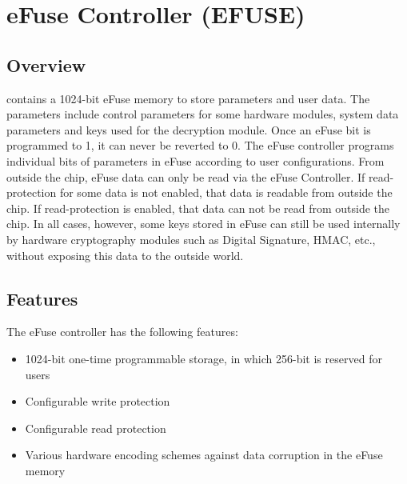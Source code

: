 \documentclass[main\_\_EN.tex]{subfiles}
\begin{document}

\ifglobal
\else
    {\let\clearpage\relax \listoftodos}
    {\let\clearpage\relax \listofdonetodos}
    \tableofcontents
\fi



\hypertarget{efuse}{}
\chapter{eFuse Controller (EFUSE)}
\label{mod:efuse}

\section{Overview}

\chipname{} contains a 1024-bit eFuse memory to store parameters and user data. The parameters include control parameters for some hardware modules, system data parameters and keys used for the decryption module. Once an eFuse bit is programmed to 1, it can never be reverted to 0. The eFuse controller programs individual bits of parameters in eFuse according to user configurations. From outside the chip, eFuse data can only be read via the eFuse Controller. If read-protection for some data is not enabled, that data is readable from outside the chip. If read-protection is enabled, that data can not be read from outside the chip. In all cases, however, some keys stored in eFuse can still be used internally by hardware cryptography modules such as Digital Signature, HMAC, etc., without exposing this data to the outside world.

\section{Features}

The eFuse controller has the following features:

\begin{itemize}
    \item 1024-bit one-time programmable storage, in which 256-bit is reserved for users
    \item Configurable write protection
    \item Configurable read protection
    \item Various hardware encoding schemes against data corruption in the eFuse memory
\end{itemize}
\end{document}
